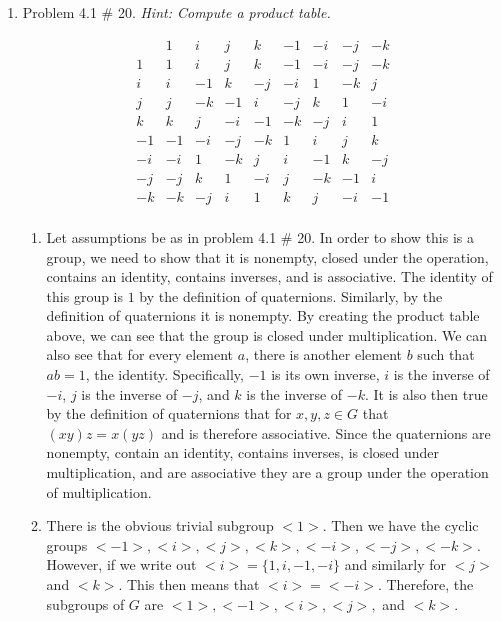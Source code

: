 \documentclass[11pt]{article}
\begin{document}
\begin{enumerate}

\item Problem 4.1 \# 20.  \emph{Hint: Compute a product table.}

\[ \begin{array}{r|*{8}{r}}
& 1 & i & j & k & -1 & -i & -j & -k \\ \hline
1 & 1 & i & j & k & -1 & -i & -j & -k \\
i & i & -1 & k & -j & -i & 1 & -k & j \\
j & j & -k & -1 & i & -j & k & 1 & -i \\
k & k & j & -i & -1 & -k & -j & i & 1 \\
-1 & -1 & -i & -j & -k & 1 & i & j & k \\
-i & -i & 1 & -k & j & i & -1 & k & -j \\
-j & -j & k & 1 & -i & j & -k & -1 & i \\
-k & -k & -j & i & 1 & k & j & -i & -1 \\
\end{array} \]
\begin{enumerate}
    \item 
    
    Let assumptions be as in problem 4.1 \# 20. In order to show this is a group, we need to show that it is nonempty, closed under the operation, contains an identity, contains inverses, and is associative. The identity of this group is $1$ by the definition of quaternions. Similarly, by the definition of quaternions it is nonempty. By creating the product table above, we can see that the group is closed under multiplication. We can also see that for every element $a$, there is another element $b$ such that $ab = 1$, the identity. Specifically, $-1$ is its own inverse, $i$ is the inverse of $-i$, $j$ is the inverse of $-j$, and $k$ is the inverse of $-k$. It is also then true by the definition of quaternions that for $x, y, z\in G$ that $(xy)z=x(yz)$ and is therefore associative. Since the quaternions are nonempty, contain an identity, contains inverses, is closed under multiplication, and are associative they are a group under the operation of multiplication.
    
    \item
    
    There is the obvious trivial subgroup $<1>$. Then we have the cyclic groups $<-1>, <i>, <j>, <k>, <-i>, <-j>, <-k>$. However, if we write out $<i> = \{1, i, -1, -i\}$ and similarly for $<j>$ and $<k>$. This then means that $<i>=<-i>$. Therefore, the subgroups of $G$ are $<1>,<-1>,<i>,<j>,$ and $<k>.$
    

\end{enumerate}
\end{enumerate}
\end{document}
